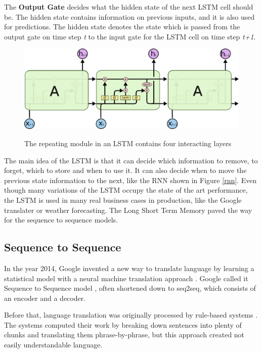 The \textbf{Output Gate} decides what the hidden state of the next LSTM cell should be. The hidden state contains information on previous inputs, and it is also used for predictions. The hidden state denotes the state which is passed from the output gate on time step \textit{t} to the input gate for the LSTM cell on time step \textit{t+1}.


\begin{figure}
	\begin{center}
		\includegraphics[width=4.5in]{photos/LSTM3-chain}\\
		\caption{The repeating module in an LSTM contains four interacting layers \cite{olah}}\label{lstm2}
	\end{center}
\end{figure}

The main idea of the LSTM is that it can decide which information to remove, to forget, which to store and when to use it. It can also decide when to move the previous state information to the next, like the RNN shown in Figure \ref{rnn}. Even though many variations of the LSTM occupy the state of the art performance, the LSTM is used in many real business cases in production, like the Google translater or weather forecasting.
The Long Short Term Memory paved the way for the sequence to sequence models.

\subsection{Sequence to Sequence}\label{ss:seq2seq}
In the year 2014, Google invented a new way to translate language by learning a statistical model with a neural machine translation approach \cite{seq2seq}. Google called it Sequence to Sequence model \cite{seq2seq}, often shortened down to seq2seq, which consists of an encoder and a decoder. 

Before that, language translation was originally processed by rule-based systems \cite{chen-goodman}. The systems computed their work by breaking down sentences into plenty of chunks and translating them phrase-by-phrase, but this approach created not easily understandable language.

